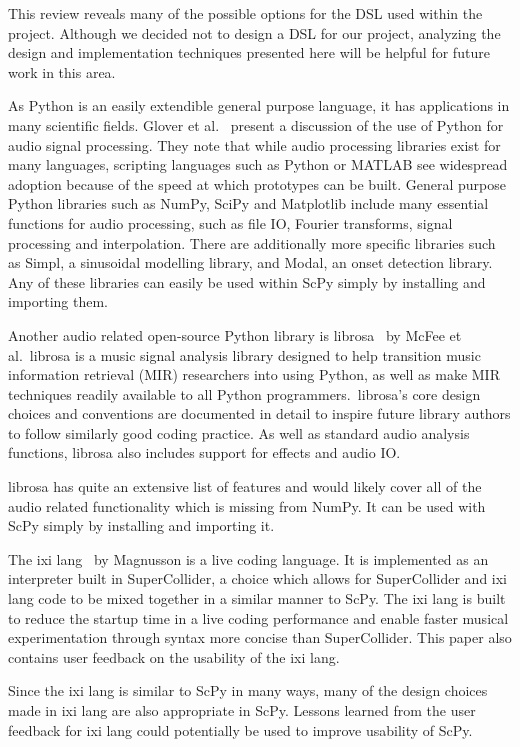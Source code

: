 \documentclass{article}
\begin{document}
This review reveals many of the possible options for the DSL used within the project. Although we
decided not to design a DSL for our project, analyzing the design and implementation techniques
presented here will be helpful for future work in this area.

As Python is an easily extendible general purpose language, it has applications in many scientific
fields. Glover et al.~\cite{glover2011python} present a discussion of the use of Python for audio
signal processing. They note that while audio processing libraries exist for many languages,
scripting languages such as Python or MATLAB see widespread adoption because of the speed at which
prototypes can be built. General purpose Python libraries such as NumPy, SciPy and Matplotlib
include many essential functions for audio processing, such as file IO, Fourier transforms, signal
processing and interpolation. There are additionally more specific libraries such as Simpl, a
sinusoidal modelling library, and Modal, an onset detection library. Any of these libraries can
easily be used within ScPy simply by installing and importing them.

Another audio related open-source Python library is librosa~\cite{mcfee2015librosa} by McFee et
al.\ librosa is a music signal analysis library designed to help transition music information
retrieval (MIR) researchers into using Python, as well as make MIR techniques readily available to
all Python programmers.\ librosa's core design choices and conventions are documented in detail to
inspire future library authors to follow similarly good coding practice. As well as standard audio
analysis functions, librosa also includes support for effects and audio IO.\@

librosa has quite an extensive list of features and would likely cover all of the audio related
functionality which is missing from NumPy. It can be used with ScPy simply by installing and importing
it.

The ixi lang~\cite{magnusson2011ixi} by Magnusson is a live coding language. It is implemented as an interpreter
built in SuperCollider, a choice which allows for SuperCollider and ixi lang code to be mixed
together in a similar manner to ScPy. The ixi lang is built to reduce the startup time in a live
coding performance and enable faster musical experimentation through syntax more concise than
SuperCollider. This paper also contains user feedback on the usability of the ixi lang.

Since the ixi lang is similar to ScPy in many ways, many of the design choices made in ixi lang are
also appropriate in ScPy. Lessons learned from the user feedback for ixi lang could
potentially be used to improve usability of ScPy.
\end{document}
